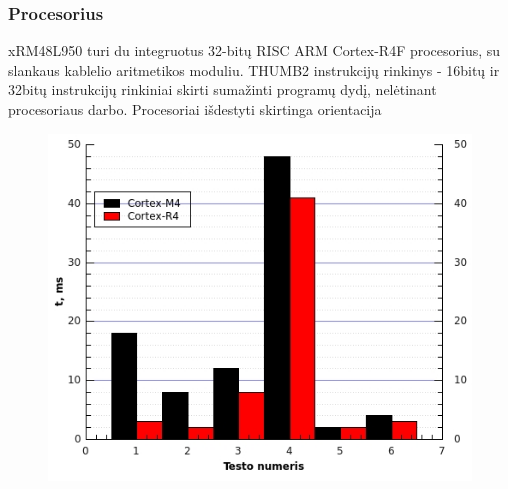 \documentclass[a4paper, 12pt]{article} %
\begin{document}
\begin{onehalfspacing}
\subsubsection{Procesorius}
xRM48L950 turi du integruotus 32-bit\k{u} RISC ARM Cortex-R4F procesorius, su slankaus kablelio aritmetikos moduliu. THUMB2 instrukcij\k{u} rinkinys - 16bit\k{u} ir 32bit\k{u} instrukcij\k{u} rinkiniai skirti suma\v{z}inti program\k{u} dyd\k{i}, nel\.etinant procesoriaus darbo. Procesoriai i\v{s}destyti skirtinga orientacija  
\begin{figure}[H] %
\centering %
\includegraphics[scale=0.8]{pav/testai.jpg} %
\captionsetup{labelformat=numbfirst} %
\captionsetup{labelseparator=tarpas}



\end{figure}
\end{onehalfspacing}
\end{document}
